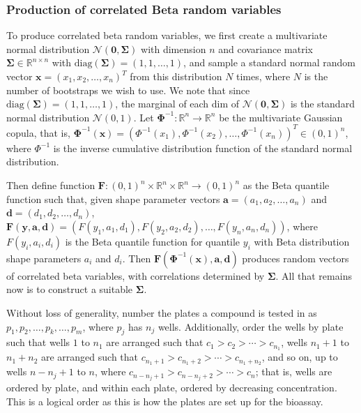 \documentclass[11pt, letterpaper]{article}
\newcommand{\mbb}[1]{\mathbb{#1}}
\newcommand{\mc}[1]{\mathcal{#1}}
\numberwithin{equation}{section}
\begin{document}
\subsubsection{Production of correlated Beta random variables}\label{sect:sigma}
To produce correlated beta random variables, we first create a multivariate normal distribution $\mc N(\bm 0, \bm \Sigma)$ with dimension $n$ and covariance matrix $\bm \Sigma \in \mbb R^{n \times n}$ with $\text{diag} (\bm \Sigma) = (1, 1, \dots, 1)$, and sample a standard normal random vector $\bm x = (x_1, x_2, \dots, x_n)^T$ from this distribution $N$ times, where $N$ is the number of bootstraps we wish to use. We note that since $\text{diag} (\bm \Sigma) = (1, 1, \dots, 1)$, the marginal of each dim of $\mc N(\bm 0, \bm \Sigma)$ is the standard normal distribution $\mc N(0,1)$. Let $\bm \Phi^{-1} : \mbb R^n \to \mbb R^n$ be the multivariate Gaussian copula, that is, $\bm \Phi^{-1}(\bm x) = \left( \Phi^{-1}(x_1),  \Phi^{-1}(x_2), \dots,  \Phi^{-1}(x_n)\right)^T\in (0,1)^n$, where $ \Phi^{-1}$ is the inverse cumulative distribution function of the standard normal distribution. 

Then define function $\textbf{F}: (0,1)^n \times \mbb R^n \times \mbb R^n \to (0,1)^n$ as the Beta quantile function such that, given shape parameter vectors $\bm a = (a_1, a_2, \dots, a_n)$ and $\bm d = (d_1, d_2, \dots, d_n)$, $\textbf{F}(\bm y, \bm a, \bm d) = \left(F(y_1, a_1, d_1), F(y_2, a_2, d_2), \dots, F(y_n, a_n, d_n) \right)$, where $F(y_i, a_i, d_i)$ is the Beta quantile function for quantile $y_i$ with Beta distribution shape parameters $a_i$ and $d_i$. Then $\bm F\left(\bm \Phi^{-1} (\bm x), \bm a, \bm d \right)$ produces random vectors of correlated beta variables, with correlations determined by $\bm  \Sigma$. All that remains now is to construct a suitable $\bm  \Sigma$. 

Without loss of generality, number the plates a compound is tested in as $p_1, p_2,\dots, p_k, \dots, p_m$, where $p_j$ has $n_j$ wells. Additionally, order the wells by plate such that wells $1$ to $n_1$ are arranged such that $c_1 > c_2 > \cdots > c_{n_1}$, wells $n_1+1$ to $n_1+n_2$ are arranged such that $c_{n_1+1} > c_{n_1+2} > \cdots > c_{n_1 +n_2}$, and so on, up to wells $n - n_j + 1$ to $n$, where $c_{n-n_j+1} > c_{n - n_j+2} > \cdots > c_{n}$; that is, wells are ordered by plate, and within each plate, ordered by decreasing concentration. This is a logical order as this is how the plates are set up for the bioassay.
\end{document}
